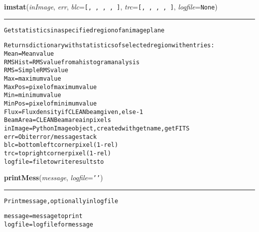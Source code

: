    \label{VLBACal:imstat}
    \vspace{0.5ex}

    \begin{boxedminipage}{\textwidth}

    \raggedright \textbf{imstat}(\textit{inImage}, \textit{err}, \textit{blc}=\texttt{[\-,\-~\-,\-~\-,\-~\-,\-~\-]\-}, \textit{trc}=\texttt{[\-,\-~\-,\-~\-,\-~\-,\-~\-]\-}, \textit{logfile}=\texttt{N\-o\-n\-e\-})

    \vspace{-1.5ex}

    \rule{\textwidth}{0.5\fboxrule}
\begin{alltt}
Get statistics in a specified region of an image plane

Returns dictionary with statistics of selected region with entries:
    Mean    = Mean value
    RMSHist = RMS value from a histogram analysis
    RMS     = Simple RMS value
    Max     = maximum value
    MaxPos  = pixel of maximum value
    Min     = minimum value
    MinPos  = pixel of minimum value
    Flux    = Flux density if CLEAN beam given, else -1
    BeamArea= CLEAN Beam area in pixels
inImage   = Python Image object, created with getname, getFITS
err      = Obit error/message stack
blc      = bottom left corner pixel (1-rel)
trc      = top right corner pixel (1-rel)
logfile  = file to write results to\end{alltt}

    \vspace{1ex}

    \end{boxedminipage}

    \label{VLBACal:printMess}
    \vspace{0.5ex}

    \begin{boxedminipage}{\textwidth}

    \raggedright \textbf{printMess}(\textit{message}, \textit{logfile}=\texttt{'\-'\-})

    \vspace{-1.5ex}

    \rule{\textwidth}{0.5\fboxrule}
\begin{alltt}
Print message, optionally in logfile


message = message to print
logfile = logfile for message\end{alltt}

    \vspace{1ex}

    \end{boxedminipage}

